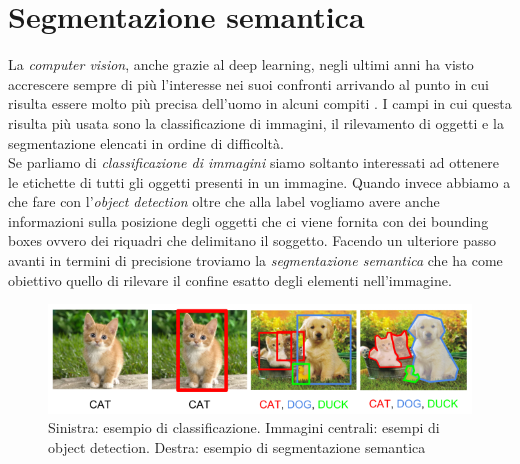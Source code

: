 \section{Segmentazione semantica}
La \textit{computer vision}, anche grazie al deep learning, negli ultimi anni ha visto accrescere sempre di più l'interesse nei suoi confronti arrivando al punto in cui risulta essere molto più precisa dell'uomo in alcuni compiti \cite{Geirhos2017a}. I campi in cui questa risulta più usata sono la classificazione di immagini, il rilevamento di oggetti e la segmentazione elencati in ordine di difficoltà.\\
Se parliamo di \textit{classificazione di immagini} siamo soltanto interessati ad ottenere le etichette di tutti gli oggetti presenti in un immagine. Quando invece abbiamo a che fare con l'\textit{object detection} oltre che alla label vogliamo avere anche informazioni sulla posizione degli oggetti che ci viene fornita con dei bounding boxes ovvero dei riquadri che delimitano il soggetto. Facendo un ulteriore passo avanti in termini di precisione troviamo la \textit{segmentazione semantica} che ha come obiettivo quello di rilevare il confine esatto degli elementi nell'immagine.
\begin{figure}[h!]
	\centering
	\includegraphics[width=1\linewidth]{../immagini/types}
	\caption[Task principali della Computer Vision]{Sinistra: esempio di classificazione. Immagini centrali: esempi di object detection. Destra: esempio di segmentazione semantica }
	\label{fig:types}
\end{figure}


